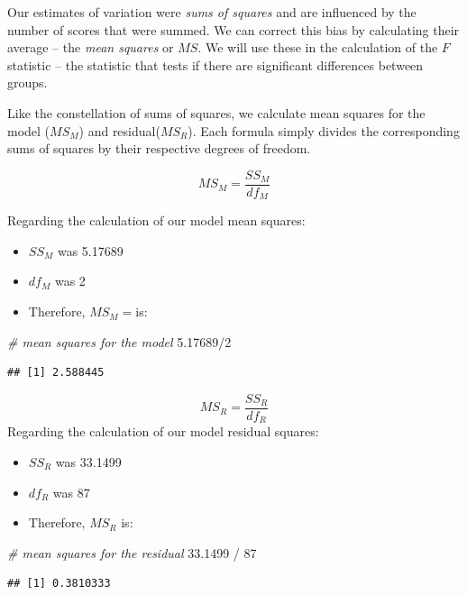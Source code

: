 \documentclass[
  english,
]{book}
\newenvironment{Shaded}{\begin{snugshade}}{\end{snugshade}}
\newcommand{\CommentTok}[1]{\textcolor[rgb]{0.56,0.35,0.01}{\textit{#1}}}
\newcommand{\DecValTok}[1]{\textcolor[rgb]{0.00,0.00,0.81}{#1}}
\newcommand{\FloatTok}[1]{\textcolor[rgb]{0.00,0.00,0.81}{#1}}
\newcommand{\SpecialCharTok}[1]{\textcolor[rgb]{0.00,0.00,0.00}{#1}}
\providecommand{\tightlist}{%
  \setlength{\itemsep}{0pt}\setlength{\parskip}{0pt}}
\begin{document}
Our estimates of variation were \emph{sums of squares} and are influenced by the number of scores that were summed. We can correct this bias by calculating their average -- the \emph{mean squares} or \(MS\). We will use these in the calculation of the \(F\) statistic -- the statistic that tests if there are significant differences between groups.

Like the constellation of sums of squares, we calculate mean squares for the model (\(MS_M\)) and residual(\(MS_R\)). Each formula simply divides the corresponding sums of squares by their respective degrees of freedom.

\[MS_M = \frac{SS_{M}}{df{_{M}}}\]

Regarding the calculation of our model mean squares:

\begin{itemize}
\tightlist
\item
  \(SS_M\) was 5.17689
\item
  \(df_M\) was 2
\item
  Therefore, \(MS_M=\)is:
\end{itemize}

\begin{Shaded}
\begin{Highlighting}[]
\CommentTok{\# mean squares for the model}
\FloatTok{5.17689}\SpecialCharTok{/}\DecValTok{2}
\end{Highlighting}
\end{Shaded}

\begin{verbatim}
## [1] 2.588445
\end{verbatim}

\[MS_R = \frac{SS_{R}}{df{_{R}}}\]
Regarding the calculation of our model residual squares:

\begin{itemize}
\tightlist
\item
  \(SS_R\) was 33.1499
\item
  \(df_R\) was 87
\item
  Therefore, \(MS_R\) is:
\end{itemize}

\begin{Shaded}
\begin{Highlighting}[]
\CommentTok{\# mean squares for the residual}
\FloatTok{33.1499} \SpecialCharTok{/} \DecValTok{87}
\end{Highlighting}
\end{Shaded}

\begin{verbatim}
## [1] 0.3810333
\end{verbatim}
\end{document}

